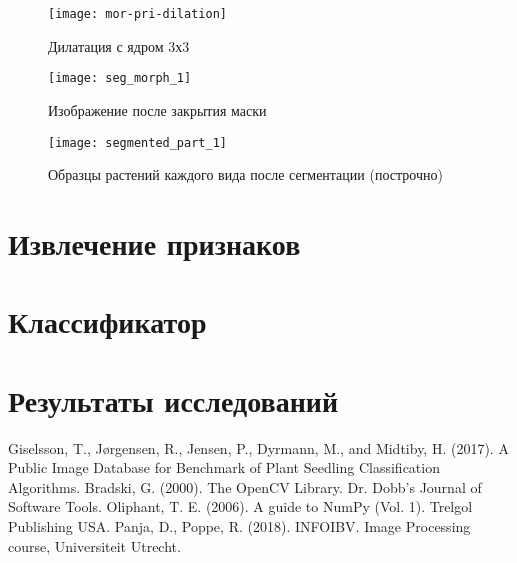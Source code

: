 \documentclass[12pt]{article}
\begin{document}
\begin{figure}[h]
	\centering
	\texttt{[image: mor-pri-dilation]}
	\caption{Дилатация с ядром 3х3}
	\label{fig_6}
\end{figure}




\begin{figure}[h]
	\centering
	\texttt{[image: seg\_morph\_1]}
	\caption{Изображение после закрытия маски}
	\label{fig_7}
\end{figure}


\begin{figure}[h]
	\centering
	\texttt{[image: segmented\_part\_1]}
	\caption{Образцы растений каждого вида после сегментации (построчно)}
	\label{fig_8}
\end{figure}

\section{Извлечение признаков}

\section{Классификатор}

\section{Результаты исследований}

\newpage

\begin{thebibliography}{}
	 Giselsson, T., Jørgensen, R., Jensen, P., Dyrmann, M., and Midtiby, H. (2017). A Public Image Database for Benchmark of Plant Seedling Classification Algorithms. 
	 Bradski, G. (2000). The OpenCV Library. Dr. Dobb's Journal of Software Tools.
	 Oliphant, T. E. (2006). A guide to NumPy (Vol. 1). Trelgol Publishing USA.
	 Panja, D., Poppe, R. (2018). INFOIBV. Image Processing course, Universiteit Utrecht.
\end{thebibliography}
\end{document}
